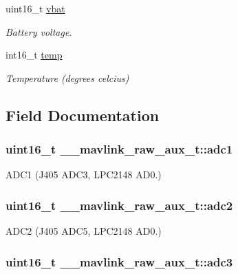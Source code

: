 \begin{DoxyCompactItemize}
uint16\+\_\+t \hyperlink{struct____mavlink__raw__aux__t_a249bd8bb4b618e00a28d88c4886d34a6}{vbat}
\begin{DoxyCompactList}\small\item\em Battery voltage. \end{DoxyCompactList}\item 
int16\+\_\+t \hyperlink{struct____mavlink__raw__aux__t_a0182ad090cd222ca388661668bfd40d7}{temp}
\begin{DoxyCompactList}\small\item\em Temperature (degrees celcius) \end{DoxyCompactList}\end{DoxyCompactItemize}


\subsection{Field Documentation}
\hypertarget{struct____mavlink__raw__aux__t_a3aef53e08ea480853c1bb5165c8ac52a}{
\subsubsection[{adc1}]{\setlength{\rightskip}{0pt plus 5cm}uint16\+\_\+t \+\_\+\+\_\+mavlink\+\_\+raw\+\_\+aux\+\_\+t\+::adc1}}\label{struct____mavlink__raw__aux__t_a3aef53e08ea480853c1bb5165c8ac52a}


A\+D\+C1 (J405 A\+D\+C3, L\+P\+C2148 A\+D0.) 

\hypertarget{struct____mavlink__raw__aux__t_a86a9158efd3095b7ce52e9f539c14624}{
\subsubsection[{adc2}]{\setlength{\rightskip}{0pt plus 5cm}uint16\+\_\+t \+\_\+\+\_\+mavlink\+\_\+raw\+\_\+aux\+\_\+t\+::adc2}}\label{struct____mavlink__raw__aux__t_a86a9158efd3095b7ce52e9f539c14624}


A\+D\+C2 (J405 A\+D\+C5, L\+P\+C2148 A\+D0.) 

\hypertarget{struct____mavlink__raw__aux__t_a971f20d82f42781dc19696eefd31b770}{
\subsubsection[{adc3}]{\setlength{\rightskip}{0pt plus 5cm}uint16\+\_\+t \+\_\+\+\_\+mavlink\+\_\+raw\+\_\+aux\+\_\+t\+::adc3}}\label{struct____mavlink__raw__aux__t_a971f20d82f42781dc19696eefd31b770}



